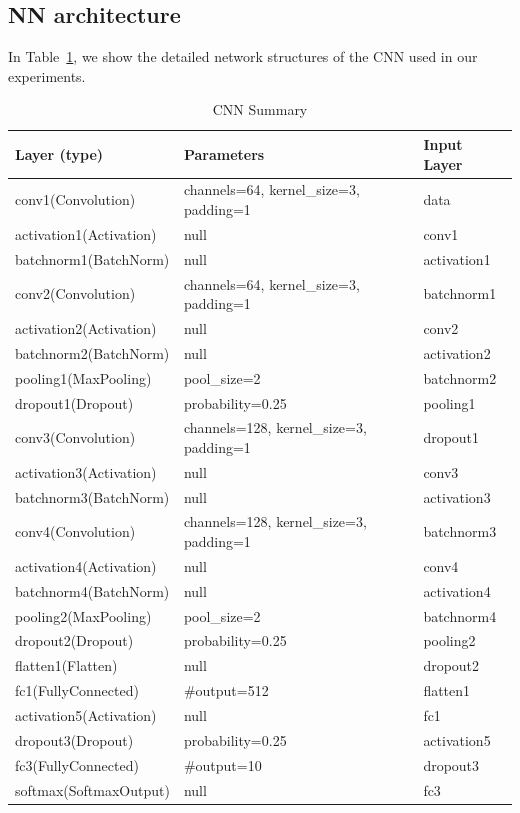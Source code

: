 \documentclass{opt2020} %
\begin{document}
\subsection{NN architecture}
\label{sec:sup_exp}
In Table~\ref{tbl:cnn}, we show the detailed network structures of the CNN used in our experiments.
\begin{table}[htb!]
\centering
\caption{CNN Summary}
\label{tbl:cnn}
\begin{tabular}{|l|l|l|}
\hline
Layer (type) & Parameters & Input Layer \\ \hline
conv1(Convolution)& channels=64, kernel\_size=3, padding=1 &data \\ \hline
activation1(Activation)& null &conv1 \\ \hline
batchnorm1(BatchNorm)& null &activation1 \\ \hline
conv2(Convolution)& channels=64, kernel\_size=3, padding=1 &batchnorm1 \\ \hline
activation2(Activation)& null &conv2 \\ \hline
batchnorm2(BatchNorm)& null &activation2 \\ \hline
pooling1(MaxPooling)& pool\_size=2 &batchnorm2 \\ \hline
dropout1(Dropout)& probability=0.25 &pooling1 \\ \hline
conv3(Convolution)& channels=128, kernel\_size=3, padding=1 &dropout1 \\ \hline
activation3(Activation)& null &conv3 \\ \hline
batchnorm3(BatchNorm)& null &activation3 \\ \hline
conv4(Convolution)& channels=128, kernel\_size=3, padding=1 &batchnorm3 \\ \hline
activation4(Activation)& null &conv4 \\ \hline
batchnorm4(BatchNorm)& null &activation4 \\ \hline
pooling2(MaxPooling)& pool\_size=2 &batchnorm4 \\ \hline
dropout2(Dropout)& probability=0.25 &pooling2 \\ \hline
flatten1(Flatten)& null &dropout2 \\ \hline
fc1(FullyConnected)& \#output=512 &flatten1 \\ \hline
activation5(Activation)& null &fc1 \\ \hline
dropout3(Dropout)& probability=0.25 &activation5 \\ \hline
fc3(FullyConnected)& \#output=10 &dropout3 \\ \hline
softmax(SoftmaxOutput)& null &fc3 \\ \hline
\end{tabular}
\end{table}

\end{document}
